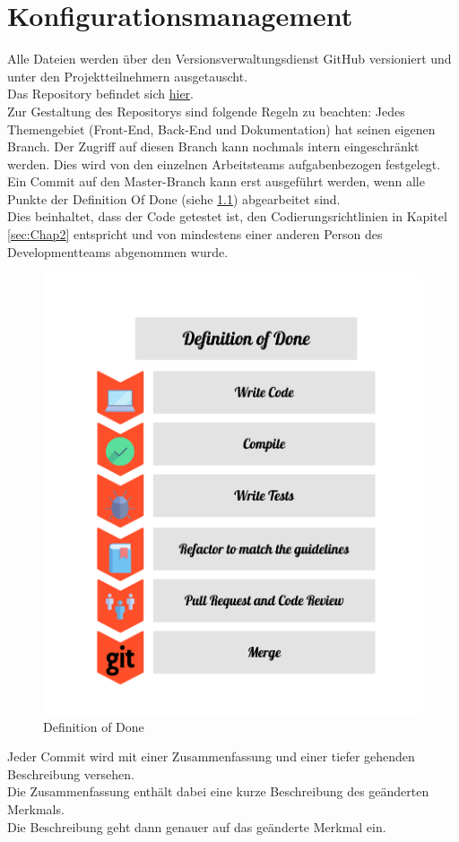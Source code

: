 
\chapter{Konfigurationsmanagement}
Alle Dateien werden über den Versionsverwaltungsdienst GitHub versioniert und unter den Projektteilnehmern ausgetauscht.\\
Das Repository befindet sich \href{https://github.com/LucRome/SWE_Semester4}{hier}.\\

Zur Gestaltung des Repositorys sind folgende Regeln zu beachten:
Jedes Themengebiet (Front-End, Back-End und Dokumentation) hat seinen eigenen Branch.
Der Zugriff auf diesen Branch kann nochmals intern eingeschränkt werden. Dies wird von den einzelnen Arbeitsteams aufgabenbezogen festgelegt. \\
Ein Commit auf den Master-Branch kann erst ausgeführt werden, wenn alle Punkte der Definition Of Done (siehe \ref{fib:DOD}) abgearbeitet sind. \\
Dies beinhaltet, dass der Code getestet ist, den Codierungsrichtlinien in Kapitel \ref{sec:Chap2} entspricht und von mindestens einer anderen Person des Developmentteams abgenommen wurde. \\

\begin{figure}[H]
\centering
\includegraphics[height=.6\textwidth]{definition_of_done.png}
\caption{Definition of Done}
\label{fib:DOD}
\end{figure}

Jeder Commit wird mit einer Zusammenfassung und einer tiefer gehenden Beschreibung versehen. \\
Die Zusammenfassung enthält dabei eine kurze Beschreibung des geänderten Merkmals. \\
Die Beschreibung geht dann genauer auf das geänderte Merkmal ein. \\

